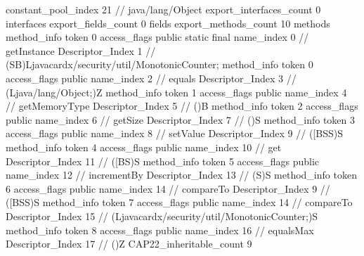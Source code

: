 {{{{				constant_pool_index	21		// java/lang/Object
			}
			export_interfaces_count	0
			interfaces {
			}
			export_fields_count	0
			fields {
			}
			export_methods_count	10
			methods {
				method_info {
					token	0
					access_flags	public static final
					name_index	0		// getInstance
					Descriptor_Index	1		// (SB)Ljavacardx/security/util/MonotonicCounter;
				}
				method_info {
					token	0
					access_flags	public
					name_index	2		// equals
					Descriptor_Index	3		// (Ljava/lang/Object;)Z
				}
				method_info {
					token	1
					access_flags	public
					name_index	4		// getMemoryType
					Descriptor_Index	5		// ()B
				}
				method_info {
					token	2
					access_flags	public
					name_index	6		// getSize
					Descriptor_Index	7		// ()S
				}
				method_info {
					token	3
					access_flags	public
					name_index	8		// setValue
					Descriptor_Index	9		// ([BSS)S
				}
				method_info {
					token	4
					access_flags	public
					name_index	10		// get
					Descriptor_Index	11		// ([BS)S
				}
				method_info {
					token	5
					access_flags	public
					name_index	12		// incrementBy
					Descriptor_Index	13		// (S)S
				}
				method_info {
					token	6
					access_flags	public
					name_index	14		// compareTo
					Descriptor_Index	9		// ([BSS)S
				}
				method_info {
					token	7
					access_flags	public
					name_index	14		// compareTo
					Descriptor_Index	15		// (Ljavacardx/security/util/MonotonicCounter;)S
				}
				method_info {
					token	8
					access_flags	public
					name_index	16		// equalsMax
					Descriptor_Index	17		// ()Z
				}
			}
			CAP22_inheritable_count	9
		}
	}
}
